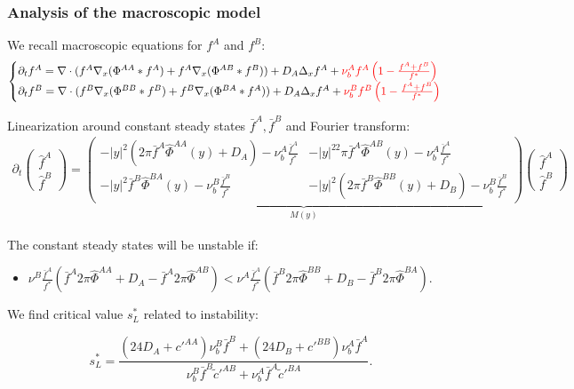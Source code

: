 \documentclass[10pt]{beamer}
\def \p {{\partial}}
\def \bfA {{\bar{f}^A}}
\def \bfB {{\bar{f}^B}}
\def \hPAA {{\hat{\Phi}^{AA}}}
\def \hPBB {{\hat{\Phi}^{BB}}}
\def \hPAB {{\hat{\Phi}^{AB}}}
\def \hPBA {{\hat{\Phi}^{BA}}}
\newcommand\Fontvi{\fontsize{8}{7.2}\selectfont}
\begin{document}
\begin{frame}
\frametitle{Analysis of the macroscopic model}
\Fontvi
We recall macroscopic equations for $f^{A}$ and $f^{B}$:
	\begin{equation}
\begin{cases}
\p_t f^{A}=  \nabla \cdot (f^A\nabla_x(\Phi^{AA}* f^A) + f^A \nabla_x( \Phi^{AB}*f^B)) + D_A \Delta_x f^A + \textcolor{red}{\nu_{b}^{A}f^A\left( 1-\frac{f^A+f^B}{f^{*}} \right)} \\

\p_t f^{B}=  \nabla \cdot (f^B\nabla_x(\Phi^{BB}* f^B) + f^B \nabla_x (\Phi^{BA}*f^A)) + D_A \Delta_x f^A + \textcolor{red}{\nu_{b}^{B}f^B\left( 1-\frac{f^A+f^B}{f^{*}} \right)}
\end{cases}
\end{equation}

Linearization around constant steady states $\bfA, \bfB$ and Fourier transform:
\begin{align}
\p_t \begin{pmatrix} \hat{f}^A \\ \hat{f}^B
\end{pmatrix}=
\underbrace{\begin{pmatrix} -|y|^2(2\pi\bfA\hPAA(y)+D_A)-\nu_{b}^A\frac{\bfA}{f^*} & -|y|^22\pi\bfA\hPAB(y)-\nu_{b}^A\frac{\bfA}{f^*} \\ 
-|y|^2\bfB\hPBA(y)-\nu_{b}^B\frac{\bfB}{f^*} & -|y|^2(2\pi\bfB\hPBB(y)+D_B)-\nu_{b}^B\frac{\bfB}{f^*} 
\end{pmatrix}}_{M(y)}
\begin{pmatrix} \hat{f}^A \\ \hat{f}^B
\end{pmatrix}
\end{align}

The constant steady states will be unstable if:
\begin{itemize}
	\item $ \nu^{B}\frac{\bfA}{f^{*}}( \bfA 2\pi \hPAA+D_A - \bfA 2 \pi \hPAB )<
	\nu^{A} \frac{\bfA}{f^{*}}( \bfB 2 \pi \hPBB + D_B-\bfB 2\pi \hPBA ). $	
\end{itemize}

We find critical value $s_{L}^{*}$ related to instability:

$$s_{L}^{*}=\frac{(24 D_A+c'^{AA})\nu_{b}^{B}\bar{f}^{B}+(24 D_B+c'^{BB})\nu_{b}^{A}\bar{f}^A}{\nu_{b}^{B}\bar{f}^B\tilde{c}'^{AB}+\nu_{b}^{A}\bar{f}^A\tilde{c}'^{BA}}. $$


\end{frame}
\end{document}
